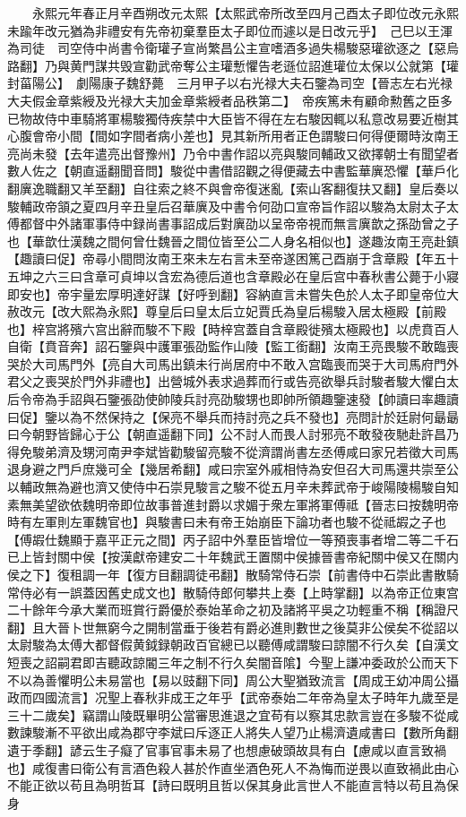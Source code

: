 　　永熙元年春正月辛酉朔改元太熙【太熙武帝所改至四月己酉太子即位改元永熙未踰年改元猶為非禮安有先帝初棄羣臣太子即位而遽以是日改元乎】　己巳以王渾為司徒　司空侍中尚書令衛瓘子宣尚繁昌公主宣嗜酒多過失楊駿惡瓘欲逐之【惡烏路翻】乃與黄門謀共毁宣勸武帝奪公主瓘慙懼告老遜位詔進瓘位太保以公就第【瓘封菑陽公】　劇陽康子魏舒薨　三月甲子以右光禄大夫石鑒為司空【晉志左右光禄大夫假金章紫綬及光禄大夫加金章紫綬者品秩第二】　帝疾篤未有顧命勲舊之臣多已物故侍中車騎將軍楊駿獨侍疾禁中大臣皆不得在左右駿因輒以私意改易要近樹其心腹會帝小間【間如字間者病小差也】見其新所用者正色謂駿曰何得便爾時汝南王亮尚未發【去年遣亮出督豫州】乃令中書作詔以亮與駿同輔政又欲擇朝士有聞望者數人佐之【朝直遥翻聞音問】駿從中書借詔觀之得便藏去中書監華廙恐懼【華戶化翻廙逸職翻又羊至翻】自往索之終不與會帝復迷亂【索山客翻復扶又翻】皇后奏以駿輔政帝頷之夏四月辛丑皇后召華廙及中書令何劭口宣帝旨作詔以駿為太尉太子太傅都督中外諸軍事侍中録尚書事詔成后對廙劭以呈帝帝視而無言廙歆之孫劭曾之子也【華歆仕漢魏之間何曾仕魏晉之間位皆至公二人身名相似也】遂趣汝南王亮赴鎮【趣讀曰促】帝尋小間問汝南王來未左右言未至帝遂困篤己酉崩于含章殿【年五十五坤之六三曰含章可貞坤以含宏為德后道也含章殿必在皇后宫中春秋書公薨于小寢即安也】帝宇量宏厚明達好謀【好呼到翻】容納直言未嘗失色於人太子即皇帝位大赦改元【改大熙為永熙】尊皇后曰皇太后立妃賈氏為皇后楊駿入居太極殿【前殿也】梓宫將殯六宫出辭而駿不下殿【時梓宫蓋自含章殿徙殯太極殿也】以虎賁百人自衛【賁音奔】詔石鑒與中護軍張劭監作山陵【監工銜翻】汝南王亮畏駿不敢臨喪哭於大司馬門外【亮自大司馬出鎮未行尚居府中不敢入宫臨喪而哭于大司馬府門外君父之喪哭於門外非禮也】出營城外表求過葬而行或告亮欲舉兵討駿者駿大懼白太后令帝為手詔與石鑒張劭使帥陵兵討亮劭駿甥也即帥所領趣鑒速發【帥讀曰率趣讀曰促】鑒以為不然保持之【保亮不舉兵而持討亮之兵不發也】亮問計於廷尉何朂朂曰今朝野皆歸心于公【朝直遥翻下同】公不討人而畏人討邪亮不敢發夜馳赴許昌乃得免駿弟濟及甥河南尹李斌皆勸駿留亮駿不從濟謂尚書左丞傅咸曰家兄若徵大司馬退身避之門戶庶幾可全【幾居希翻】咸曰宗室外戚相恃為安但召大司馬還共崇至公以輔政無為避也濟又使侍中石崇見駿言之駿不從五月辛未葬武帝于峻陽陵楊駿自知素無美望欲依魏明帝即位故事普進封爵以求媚于衆左軍將軍傅祗【晉志曰按魏明帝時有左軍則左軍魏官也】與駿書曰未有帝王始崩臣下論功者也駿不從祗嘏之子也【傅嘏仕魏顯于嘉平正元之間】丙子詔中外羣臣皆增位一等預喪事者增二等二千石已上皆封關中侯【按漢獻帝建安二十年魏武王置關中侯據晉書帝紀關中侯又在關内侯之下】復租調一年【復方目翻調徒弔翻】散騎常侍石崇【前書侍中石崇此書散騎常侍必有一誤蓋因舊史成文也】散騎侍郎何攀共上奏【上時掌翻】以為帝正位東宫二十餘年今承大業而班賞行爵優於泰始革命之初及諸將平吳之功輕重不稱【稱證尺翻】且大晉卜世無窮今之開制當垂于後若有爵必進則數世之後莫非公侯矣不從詔以太尉駿為太傅大都督假黄鉞録朝政百官總已以聽傅咸謂駿曰諒闇不行久矣【自漢文短喪之詔嗣君即吉聽政諒閽三年之制不行久矣闇音隂】今聖上謙冲委政於公而天下不以為善懼明公未易當也【易以豉翻下同】周公大聖猶致流言【周成王幼冲周公攝政而四國流言】况聖上春秋非成王之年乎【武帝泰始二年帝為皇太子時年九歲至是三十二歲矣】竊謂山陵既畢明公當審思進退之宜苟有以察其忠款言豈在多駿不從咸數諫駿漸不平欲出咸為郡守李斌曰斥逐正人將失人望乃止楊濟遺咸書曰【數所角翻遺于季翻】諺云生子癡了官事官事未易了也想慮破頭故具有白【慮咸以直言致禍也】咸復書曰衛公有言酒色殺人甚於作直坐酒色死人不為悔而逆畏以直致禍此由心不能正欲以苟且為明哲耳【詩曰既明且哲以保其身此言世人不能直言特以苟且為保身